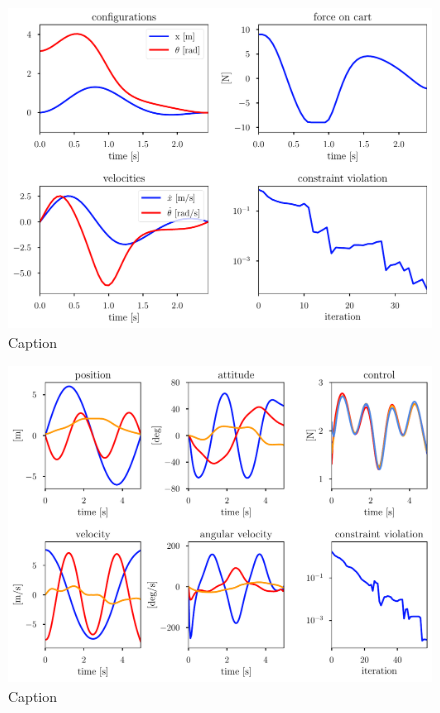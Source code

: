
\begin{figure}
    \centering
    \includegraphics[width=0.9\linewidth]{bundles/examples/cartpole_fig.pdf}
    \caption{Caption}
    \label{fig:btb:cartpole}
\end{figure}

\begin{figure}
    \centering
    \includegraphics[width=0.9\linewidth]{bundles/examples/drone_fig.pdf}
    \caption{Caption}
    \label{fig:btb:drone}
\end{figure}


